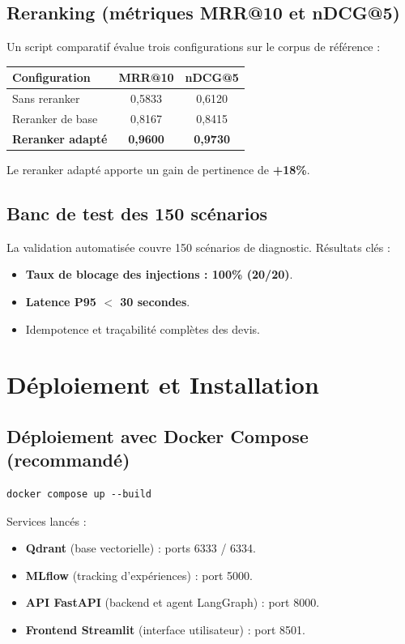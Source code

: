 \documentclass[11pt,a4paper]{article}
\begin{document}
\subsection{Reranking (métriques MRR@10 et nDCG@5)}
Un script comparatif évalue trois configurations sur le corpus de référence :

\begin{tabularx}{\textwidth}{l c c}
\toprule
Configuration & MRR@10 & nDCG@5 \\
\midrule
Sans reranker & 0,5833 & 0,6120 \\
Reranker de base & 0,8167 & 0,8415 \\
\textbf{Reranker adapté} & \textbf{0,9600} & \textbf{0,9730} \\
\bottomrule
\end{tabularx}

Le reranker adapté apporte un gain de pertinence de \textbf{+18\%}.

\subsection{Banc de test des 150 scénarios}
La validation automatisée couvre 150 scénarios de diagnostic. Résultats clés :
\begin{itemize}[leftmargin=*]
  \item \textbf{Taux de blocage des injections : 100\% (20/20)}.
  \item \textbf{Latence P95 $<$ 30 secondes}.
  \item Idempotence et traçabilité complètes des devis.
\end{itemize}

\section{Déploiement et Installation}

\subsection{Déploiement avec Docker Compose (recommandé)}
\begin{lstlisting}
docker compose up --build
\end{lstlisting}
Services lancés :
\begin{itemize}[leftmargin=*]
  \item \textbf{Qdrant} (base vectorielle) : ports 6333 / 6334.
  \item \textbf{MLflow} (tracking d'expériences) : port 5000.
  \item \textbf{API FastAPI} (backend et agent LangGraph) : port 8000.
  \item \textbf{Frontend Streamlit} (interface utilisateur) : port 8501.
\end{itemize}
\end{document}
